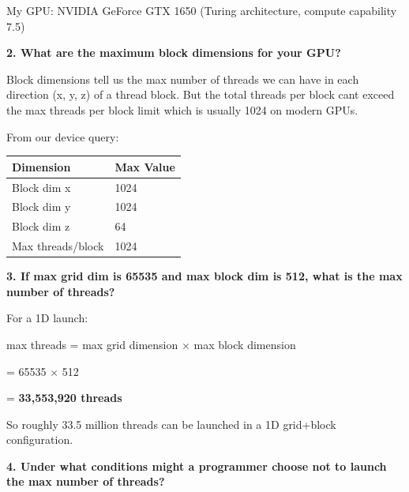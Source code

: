 \documentclass[12pt]{article}
\begin{document}
My GPU: NVIDIA GeForce GTX 1650 (Turing architecture, compute capability 7.5)

\vspace{0.5cm}

\textbf{2. What are the maximum block dimensions for your GPU?}

\vspace{0.3cm}

Block dimensions tell us the max number of threads we can have in each direction (x, y, z) of a thread block. But the total threads per block cant exceed the max threads per block limit which is usually 1024 on modern GPUs.

From our device query:

\begin{center}
\begin{tabular}{|p{4cm}|p{4cm}|}
\hline
\textbf{Dimension} & \textbf{Max Value} \\
\hline
Block dim x & 1024 \\
\hline
Block dim y & 1024 \\
\hline
Block dim z & 64 \\
\hline
Max threads/block & 1024 \\
\hline
\end{tabular}
\end{center}

\vspace{0.5cm}

\textbf{3. If max grid dim is 65535 and max block dim is 512, what is the max number of threads?}

\vspace{0.3cm}

For a 1D launch:

max threads = max grid dimension $\times$ max block dimension

= 65535 $\times$ 512

= \textbf{33,553,920 threads}

So roughly 33.5 million threads can be launched in a 1D grid+block configuration.

\vspace{0.5cm}

\textbf{4. Under what conditions might a programmer choose not to launch the max number of threads?}

\vspace{0.3cm}
\end{document}
